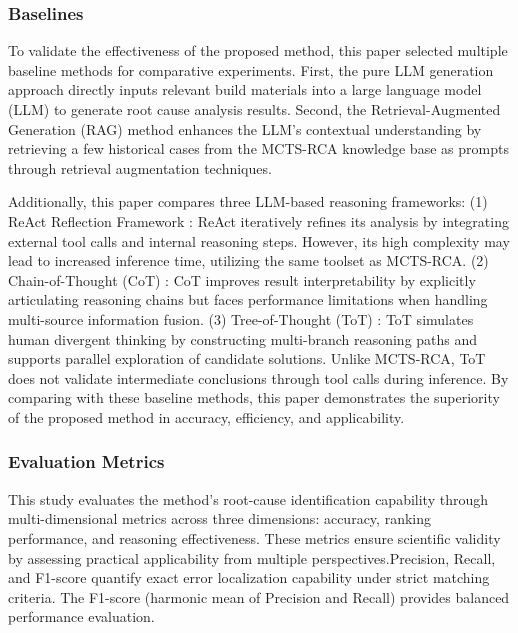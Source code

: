 \documentclass[10pt,conference]{IEEEtran}
\begin{document}
\subsubsection{Baselines}\label{ss:exp-baselines}
To validate the effectiveness of the proposed method, this paper selected multiple baseline methods for comparative experiments. First, the pure LLM generation approach directly inputs relevant build materials into a large language model (LLM) to generate root cause analysis results. Second, the Retrieval-Augmented Generation (RAG) method enhances the LLM's contextual understanding by retrieving a few historical cases from the MCTS-RCA knowledge base as prompts through retrieval augmentation techniques. 

Additionally, this paper compares three LLM-based reasoning frameworks:
(1) ReAct Reflection Framework : ReAct iteratively refines its analysis by integrating external tool calls and internal reasoning steps. However, its high complexity may lead to increased inference time, utilizing the same toolset as MCTS-RCA.
(2) Chain-of-Thought (CoT) : CoT improves result interpretability by explicitly articulating reasoning chains but faces performance limitations when handling multi-source information fusion.
(3) Tree-of-Thought (ToT) : ToT simulates human divergent thinking by constructing multi-branch reasoning paths and supports parallel exploration of candidate solutions. Unlike MCTS-RCA, ToT does not validate intermediate conclusions through tool calls during inference.
By comparing with these baseline methods, this paper demonstrates the superiority of the proposed method in accuracy, efficiency, and applicability.

\subsubsection{Evaluation Metrics}\label{ss:exp-metrics}
This study evaluates the method's root-cause identification capability through multi-dimensional metrics across three dimensions: accuracy, ranking performance, and reasoning effectiveness. These metrics ensure scientific validity by assessing practical applicability from multiple perspectives.Precision, Recall, and F1-score quantify exact error localization capability under strict matching criteria. The F1-score (harmonic mean of Precision and Recall) provides balanced performance evaluation.
\end{document}
